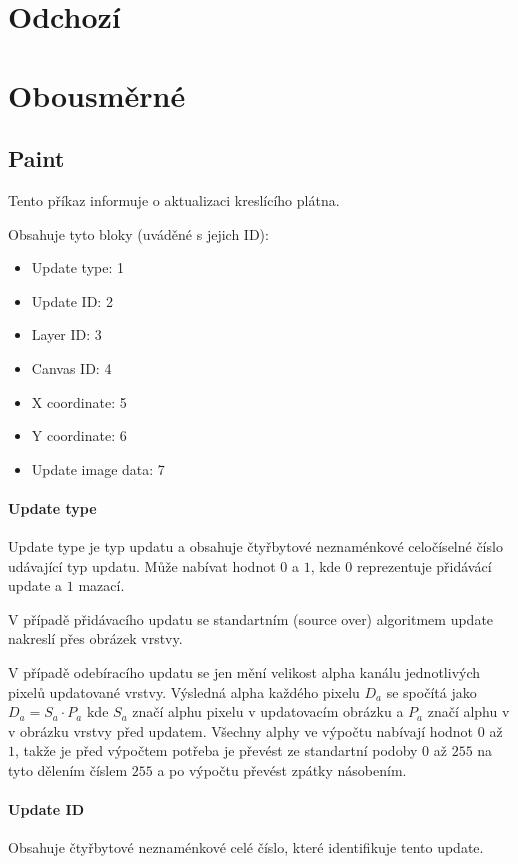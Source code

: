 \documentclass[12pt,oneside,a4paper]{report}
\begin{document}
\section{Odchozí}

\section{Obousměrné}

\subsection{Paint}

Tento příkaz informuje o aktualizaci kreslícího plátna.

Obsahuje tyto bloky (uváděné s jejich ID):

\begin{itemize}
	\item Update type: 1
	\item Update ID: 2
	\item Layer ID: 3
	\item Canvas ID: 4
	\item X coordinate: 5
	\item Y coordinate: 6
	\item Update image data: 7						
\end{itemize}

\paragraph{Update type}
Update type je typ updatu a obsahuje čtyřbytové neznaménkové celočíselné číslo udávající typ updatu. Může nabívat hodnot $0$ a $1$, kde $0$ reprezentuje přidávácí update a $1$ mazací.

V případě přidávacího updatu se standartním (source over) algoritmem update nakreslí přes obrázek vrstvy. 

V případě odebíracího updatu se jen mění velikost alpha kanálu jednotlivých pixelů updatované vrstvy. Výsledná alpha každého pixelu $D_{a}$ se spočítá jako $D_{a} = S_{a} \cdot P_{a}$ kde $S_{a}$ značí alphu pixelu v updatovacím obrázku a $P_{a}$ značí alphu v v obrázku vrstvy před updatem. Všechny alphy ve výpočtu nabívají hodnot $0$ až $1$, takže je před výpočtem potřeba je převést ze standartní podoby $0$ až $255$ na tyto dělením číslem $255$ a po výpočtu převést zpátky násobením.

\paragraph{Update ID}
Obsahuje čtyřbytové neznaménkové celé číslo, které identifikuje tento update.
\end{document}
